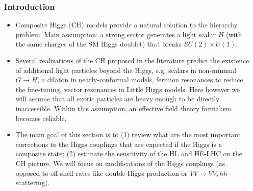 \documentclass[../report.tex]{subfiles}
\begin{document}
\subsubsection{Introduction}

\begin{itemize}
\item Composite Higgs (CH) models provide a natural solution to the hierarchy problem. Main assumption: a strong sector generates a light scalar $H$ (with the same charges of the SM Higgs doublet) that breaks $SU(2)\times U(1)$. %

\item Several realizations of the CH proposed in the literature predict the existence of additional light particles beyond the Higgs, e.g. scalars in non-minimal $G\to H$, a dilaton in nearly-conformal models, fermion resonances to reduce the fine-tuning, vector resonances in Little Higgs models. Here however we will assume that all exotic particles are heavy enough to be directly inaccessible. Within this assumption, an effective field theory formalism becomes reliable.


\item The main goal of this section is to (1) review what are the most important corrections to the Higgs couplings that are expected if the Higgs is a composite state; (2) estimate the sensitivity of the HL and HE-LHC on the CH picture. We will focus on modifications of the Higgs couplings (as opposed to off-shell rates like double-Higgs production or $VV\to VV,hh$ scattering). 



\end{itemize}
\end{document}
